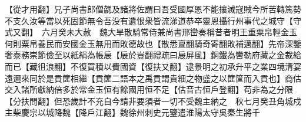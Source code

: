 【從才用翻】兄子尚書郎僧勰及諸將佐謂曰吾受國厚恩不能攘滅寇賊今所苦轉篤勢不支久汝等當以死固節無令吾没有遺恨衆皆流涕道恭卒靈恩攝行州事代之城守【守式又翻】　六月癸未大赦　魏大旱散騎常侍兼尚書邢巒奏稱昔者明王重粟帛輕金玉何則粟帛養民而安國金玉無用而敗德故也【散悉亶翻騎奇寄翻敗補邁翻】先帝深鑒奢泰務崇節儉至以紙絹為帳扆【扆於豈翻禮疏曰扆屏風】銅鐵為轡勒府藏之金裁給而已【藏徂浪翻】不復買積以費國資【復扶又翻】逮景明之初承升平之業四境清宴遠邇來同於是貢篚相繼【貢篚二語本之禹貢謂貴細之物盛之以篚筐而入貢也】商估交入諸所獻納倍多於常金玉恒有餘國用恒不足【估音古恒戶登翻】苟非為之分限【分扶問翻】但恐歲計不充自今請非要須者一切不受魏主納之　秋七月癸丑角城戍主柴慶宗以城降魏【降戶江翻】魏徐州刺史元鑒遣淮陽太守吳秦生將千